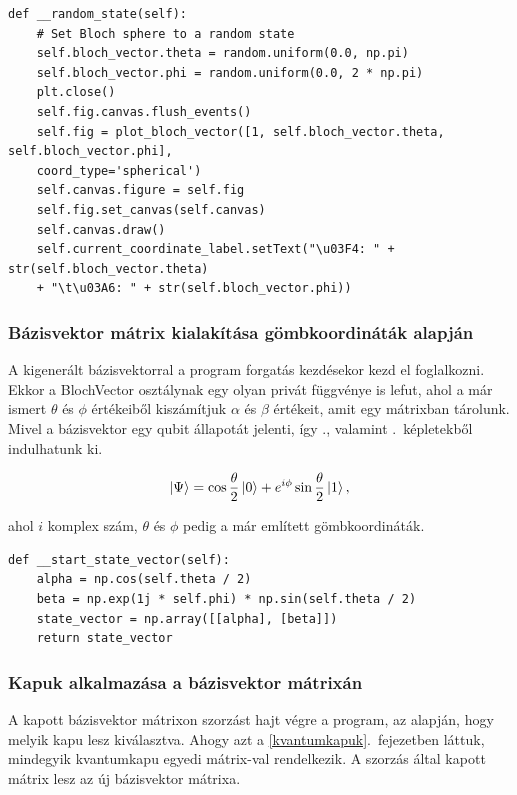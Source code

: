 \documentclass[
]{thesis-ekf}
\theoremstyle{definition}
\theoremstyle{remark}
\begin{document}
\begin{lstlisting}[caption={Véletlenszerű bázisvektor generálása és Bloch-gömb rajzolása}]
def __random_state(self):
	# Set Bloch sphere to a random state
	self.bloch_vector.theta = random.uniform(0.0, np.pi)
	self.bloch_vector.phi = random.uniform(0.0, 2 * np.pi)
	plt.close()
	self.fig.canvas.flush_events()
	self.fig = plot_bloch_vector([1, self.bloch_vector.theta, self.bloch_vector.phi],
	coord_type='spherical')
	self.canvas.figure = self.fig
	self.fig.set_canvas(self.canvas)
	self.canvas.draw()
	self.current_coordinate_label.setText("\u03F4: " + str(self.bloch_vector.theta)
	+ "\t\u03A6: " + str(self.bloch_vector.phi))
\end{lstlisting}


\subsubsection{Bázisvektor mátrix kialakítása gömbkoordináták alapján}
A kigenerált bázisvektorral a program forgatás kezdésekor kezd el foglalkozni. Ekkor a BlochVector osztálynak egy olyan privát függvénye is lefut, ahol a már ismert $\theta$ és $\phi$ értékeiből kiszámítjuk $\alpha$ és $\beta$ értékeit, amit egy mátrixban tárolunk. Mivel a bázisvektor egy qubit állapotát jelenti, így \az{\ref{qubitallapot}}., valamint \az{\ref{qubitallapothelyettesit}}.~képletekből indulhatunk ki.

\begin{equation}\label{qubitallapothelyettesit}
	\ket{\Psi}=\cos\frac{\theta}{2}\ket{0}+e^{i\phi}\sin\frac{\theta}{2}\ket{1},
\end{equation}

ahol $i$ komplex szám, $\theta$ és $\phi$ pedig a már említett gömbkoordináták.

\begin{lstlisting}[caption={Bázisvektor mátrix kialakítása a képletek alapján}]
def __start_state_vector(self):
	alpha = np.cos(self.theta / 2)
	beta = np.exp(1j * self.phi) * np.sin(self.theta / 2)
	state_vector = np.array([[alpha], [beta]])
	return state_vector
\end{lstlisting}

\subsubsection{Kapuk alkalmazása a bázisvektor mátrixán}
A kapott bázisvektor mátrixon szorzást hajt végre a program, az alapján, hogy melyik kapu lesz kiválasztva. Ahogy azt a \ref{kvantumkapuk}.~fejezetben láttuk, mindegyik kvantumkapu egyedi mátrix-val rendelkezik. A szorzás által kapott mátrix lesz az új bázisvektor mátrixa.
\end{document}
